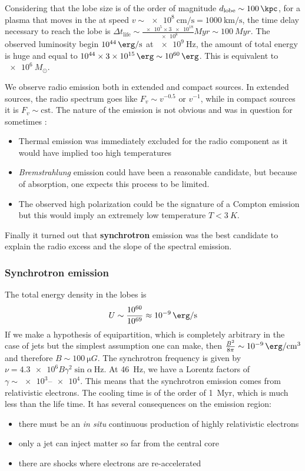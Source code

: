 \documentclass[10pt,a4paper,english]{article}
\begin{document}
Considering that the lobe size is of the order of magnitude
$d_\mathrm{lobe}\sim \SI{100}{\kpc}$, for a plasma that moves in the
at speed $v\sim \SI{e8}{\cm\per\s} = \SI{1000}{\km\per\s}$, the time
delay necessary to reach the lobe is
$\Delta t_\mathrm{life} \sim \frac{\num{e5}\times\num{3e18}}{\num{e8}}
\si{Myr} \sim \SI{100}{Myr}$. The observed luminosity begin
$\SI{e44}{\erg\per\s}$ at $\SI{e9}{\Hz}$, the amount of total energy
is huge and equal to
$\num{e44}\times\SI{3e15}{\erg} \sim \SI{e60}{\erg}$. This is
equivalent to $\SI{e6}{M_\odot}$.

We observe radio emission both in extended and compact sources. In
extended sources, the radio spectrum goes like
$F_v \sim v^{-0.5} \textrm{ or } v^{-1}$, while in compact sources it
is $F_v \sim \mathrm{cst}$. The nature of the emission is not obvious
and was in question for sometimes :
\begin{itemize}
\item Thermal emission was immediately excluded for the radio
  component as it would have implied too high temperatures
\item \emph{Bremstrahlung} emission could have been a reasonable
  candidate, but because of absorption, one expects this process to be
  limited.
\item The observed high polarization could be the signature of a
  Compton emission but this would imply an extremely low temperature
  $T < \SI{3}{K}$.
\end{itemize}

Finally it turned out that \textbf{synchrotron} emission was the best
candidate to explain the radio excess and the slope of the spectral
emission.
\subsubsection{Synchrotron emission}
The total energy density in the lobes is
\begin{equation}
  U \sim \frac{10^{60}}{10^{69}} \approx \SI{e-9}{\erg\per\s}
\end{equation}
If we make a hypothesis of equipartition, which is completely
arbitrary in the case of jets but the simplest assumption one can
make, then $\frac{B^2}{8\pi} \sim \SI{e-9}{\erg\per\cm\cubed}$ and
therefore $B \sim \SI{100}{\micro G}$. The synchrotron frequency is
given by $\nu = \num{4.3e6} B\gamma^2 \sin\alpha\ \si{\Hz}$. At
\SI{46}{Hz}, we have a Lorentz factors of
$\gamma \sim \numrange{e3}{e4}$. This means that the synchrotron
emission comes from relativistic electrons. The cooling time is of the
order of \SI{1}{Myr}, which is much less than the life time. It has
several consequences on the emission region:
\begin{itemize}
\item there must be an \emph{in situ} continuous production of highly
  relativistic electrons
\item only a jet can inject matter so far from the central core
\item there are shocks where electrons are re-accelerated
\end{itemize}
\end{document}
